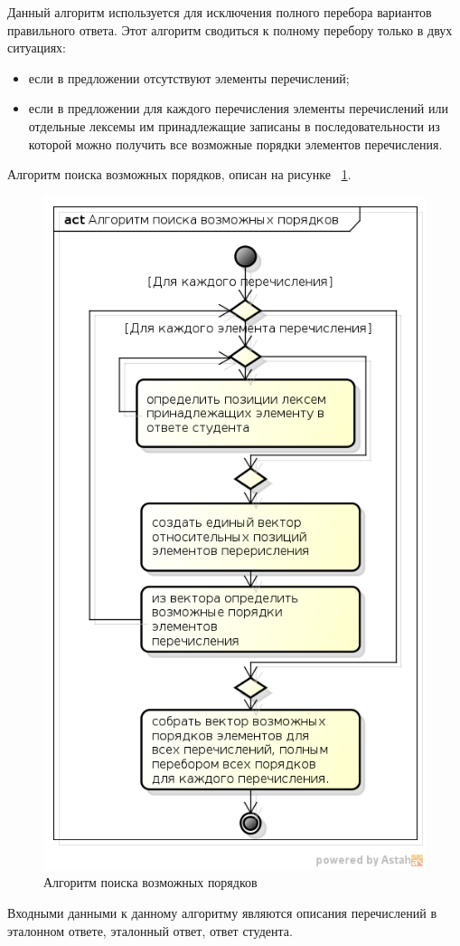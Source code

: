 \documentclass[a4paper,english,russian]{G2-105}
\begin{document}
\par Данный алгоритм используется для исключения полного перебора вариантов правильного ответа. Этот алгоритм сводиться к полному перебору только в двух ситуациях:
\begin{itemize}
    \item если в предложении отсутствуют элементы перечислений;
    \item если в предложении для каждого перечисления элементы перечислений или отдельные лексемы им принадлежащие записаны в последовательности из которой можно получить все возможные порядки элементов перечисления. 
\end{itemize}
\par Алгоритм поиска возможных порядков, описан на рисунке ~\ref{apvp1}.
\begin{figure}
    \center \includegraphics[height = 0.5\paperheight]{apvp1.png}
    \caption{Алгоритм поиска возможных порядков}
	\label{apvp1}
\end{figure}
\newpage
\par Входными данными к данному алгоритму являются описания перечислений в эталонном ответе, эталонный ответ, ответ студента.
\end{document}
